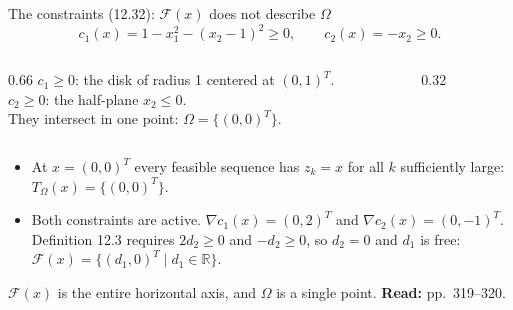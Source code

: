 \documentclass[aspectratio=169,12pt]{beamer}
\newcommand{\R}{\mathbb{R}}
\newcommand{\readbook}[1]{{\color{red}\textbf{Read:} #1}}
\newcommand{\cF}{\mathcal{F}}
\newcommand{\TO}{T_{\Omega}}
\begin{document}
\begin{frame}{The constraints (12.32): $\cF(x)$ does not describe $\Omega$}
  \[ c_{1}(x)=1-x_{1}^{2}-(x_{2}-1)^{2}\ge 0,\qquad c_{2}(x)=-x_{2}\ge 0 . \tag{12.32} \]
  \begin{columns}[T,totalwidth=\textwidth]
    \begin{column}{0.66\textwidth}
      $c_{1}\ge 0$: the disk of radius 1 centered at $(0,1)^{T}$.\\
      $c_{2}\ge 0$: the half-plane $x_{2}\le 0$.\\
      They intersect in one point: $\Omega=\{(0,0)^{T}\}$.
    \end{column}
    \begin{column}{0.32\textwidth}
      \centering
    \end{column}
  \end{columns}
  \begin{itemize}\setlength\itemsep{0.3em}
    \item At $x=(0,0)^{T}$ every feasible sequence has $z_{k}=x$ for all $k$ sufficiently large:
      $\TO(x)=\{(0,0)^{T}\}$.
    \item Both constraints are active. $\nabla c_{1}(x)=(0,2)^{T}$ and $\nabla c_{2}(x)=(0,-1)^{T}$.
      Definition 12.3 requires $2d_{2}\ge 0$ and $-d_{2}\ge 0$, so $d_{2}=0$ and $d_{1}$ is free:
      $\cF(x)=\{(d_{1},0)^{T}\mid d_{1}\in\R\}$.
  \end{itemize}
  $\cF(x)$ is the entire horizontal axis, and $\Omega$ is a single point. \readbook{pp.~319--320.}
\end{frame}
\end{document}

